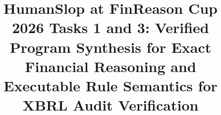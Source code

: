 \documentclass[conference]{IEEEtran}
\begin{document}

\title{HumanSlop at FinReason Cup 2026 Tasks 1 and 3: Verified Program Synthesis for Exact Financial Reasoning and Executable Rule Semantics for XBRL Audit Verification}

\author{
\and
{}
}

\maketitle
\end{document}
